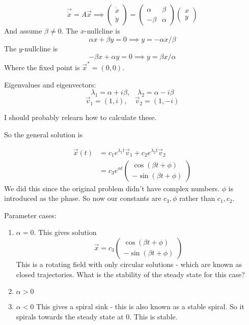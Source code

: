 \documentclass{/home/janmebows/Documents/LatexTemplates/myassignment}
\begin{document}
\[\vec{\dot x} = A\vec x \implies 
\begin{pmatrix}\dot x\\\dot y\end{pmatrix} =
\begin{pmatrix}\alpha & \beta \\-\beta &\alpha \end{pmatrix}
\begin{pmatrix}x\\y\end{pmatrix}
\]
And assume $\beta \neq 0$.
The $x$-nullcline is 
\[\alpha x + \beta y = 0 \implies y = -\alpha x/\beta\]
The $y$-nullcline is
\[-\beta x + \alpha y = 0 \implies y = \beta x/\alpha\]
Where the fixed point is $\vec x^* = (0,0)$.

Eigenvalues and eigenvectors:
\[\lambda_1 = \alpha + i\beta, \quad \lambda_2 = \alpha - i\beta\]
\[\vec v_1 = (1,i), \quad \vec v_2 = (1,-i)\]

I should probably relearn how to calculate these.

So the general solution is

\begin{align*}
    \vec x(t) &= c_1 e^{\lambda_1 t} \vec v_1 + c_2 e^{\lambda_2 t} \vec v_2\\
    &= c_3 e^{\alpha t} \begin{pmatrix}
    \cos(\beta t + \phi)\\ -\sin (\beta t + \phi)
    \end{pmatrix}
\end{align*}
We did this since the original problem didn't have complex numbers. $\phi$ is introduced as the phase. So now our constants are $c_3,\phi$ rather than $c_1,c_2$.

Parameter cases:
\begin{enumerate}
    \item $\alpha = 0$. This gives solution
    \[\vec x = c_3 \begin{pmatrix}\cos(\beta t + \phi)\\ -\sin (\beta t + \phi) \end{pmatrix}\]
    This is a rotating field with only circular solutions - which are known as closed trajectories. What is the stability of the steady state for this case?

    \item $\alpha > 0$

    \item $\alpha < 0$ This gives a spiral sink - this is also known as a stable spiral. So it spirals towards the steady state at $0$. This is stable.

\end{enumerate}
\end{document}
